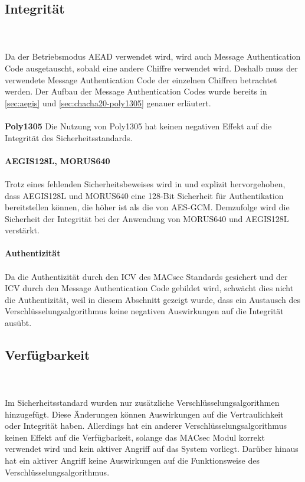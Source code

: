 \subsection{Integrität}
\\
\\
Da der Betriebsmodus \gls{AEAD} verwendet wird, wird auch Message Authentication Code ausgetauscht, sobald eine andere Chiffre verwendet wird. Deshalb muss der verwendete Message Authentication Code der einzelnen Chiffren betrachtet werden. Der Aufbau der Message Authentication Codes wurde bereits in \ref{sec:aegis} und \ref{sec:chacha20-poly1305} genauer erläutert. \\
\\
\textbf{Poly1305}
Die Nutzung von Poly1305 hat keinen negativen Effekt auf die Integrität des Sicherheitsstandards.
\\
\\
\textbf{AEGIS128L, MORUS640}
\\
\\
Trotz eines fehlenden Sicherheitsbeweises wird in \cite{10.1007/978-3-662-43414-7_10} und \cite{wuauthenticated} explizit hervorgehoben, dass AEGIS128L und MORUS640 eine 128-Bit Sicherheit für Authentikation bereitstellen können, die höher ist als die von \gls{AES-GCM}. Demzufolge wird die Sicherheit der Integrität bei der Anwendung von MORUS640 und AEGIS128L verstärkt.\\
\\
\textbf{Authentizität}
\\
\\
Da die Authentizität durch den ICV des MACsec Standards gesichert und der \gls{ICV} durch den Message Authentication Code gebildet wird, schwächt dies nicht die Authentizität, weil in diesem Abschnitt gezeigt wurde, dass ein Austausch des Verschlüsselungsalgorithmus keine negativen Auswirkungen auf die Integrität ausübt.
\subsection{Verfügbarkeit}
\\
\\
Im Sicherheitsstandard wurden nur zusätzliche Verschlüsselungsalgorithmen hinzugefügt. Diese Änderungen können Auswirkungen auf die Vertraulichkeit oder Integrität haben. Allerdings hat ein anderer Verschlüsselungsalgorithmus keinen Effekt auf die Verfügbarkeit, solange das \gls{MACsec} Modul korrekt verwendet wird und kein aktiver Angriff auf das System vorliegt. Darüber hinaus hat ein aktiver Angriff keine Auswirkungen auf die Funktionsweise des Verschlüsselungsalgorithmus.
